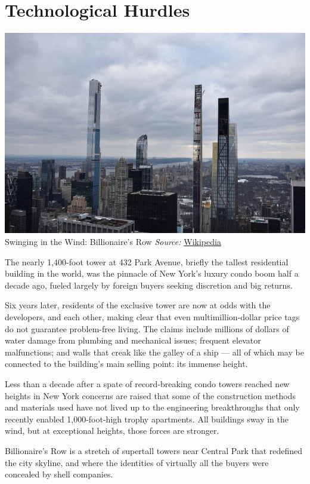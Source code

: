 \documentclass[
]{book}
\begin{document}
\hypertarget{technological-hurdles}{%
\section{Technological Hurdles}\label{technological-hurdles}}

\includegraphics{fig/billionaires_row_2020.png}
Swinging in the Wind: Billionaire's Row \emph{Source:} \href{https://commons.wikimedia.org/wiki/File:Billionaires\%27_Row_2020.jpg}{Wikipedia}

The nearly 1,400-foot tower at 432 Park Avenue, briefly the tallest residential building in the world, was the pinnacle of New York's luxury condo boom half a decade ago, fueled largely by foreign buyers seeking discretion and big returns.

Six years later, residents of the exclusive tower are now at odds with the developers, and each other, making clear that even multimillion-dollar price tags do not guarantee problem-free living. The claims include millions of dollars of water damage from plumbing and mechanical issues; frequent elevator malfunctions; and walls that creak like the galley of a ship --- all of which may be connected to the building's main selling point: its immense height.

Less than a decade after a spate of record-breaking condo towers reached new heights in New York
concerns are raised that some of the construction methods and materials used
have not lived up to the engineering breakthroughs that only recently
enabled 1,000-foot-high trophy apartments.
All buildings sway in the wind, but at exceptional heights, those forces are stronger.

Billionaire's Row is a stretch of supertall towers near Central Park that redefined the city skyline,
and where the identities of virtually all the buyers were concealed by shell companies.
\end{document}
